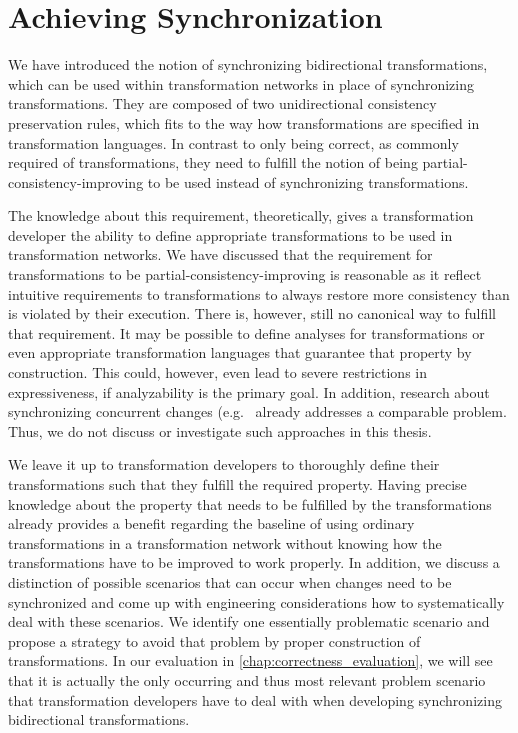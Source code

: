 \section{Achieving Synchronization} %
\label{chap:synchronization:achieving}

We have introduced the notion of synchronizing bidirectional transformations, which can be used within transformation networks in place of synchronizing transformations.
They are composed of two unidirectional consistency preservation rules, which fits to the way how transformations are specified in transformation languages.
In contrast to only being correct, as commonly required of transformations, they need to fulfill the notion of being partial-consistency-improving to be used instead of synchronizing transformations.

The knowledge about this requirement, theoretically, gives a transformation developer the ability to define appropriate transformations to be used in transformation networks.
We have discussed that the requirement for transformations to be partial-consistency-improving is reasonable as it reflect intuitive requirements to transformations to always restore more consistency than is violated by their execution.
There is, however, still no canonical way to fulfill that requirement.
It may be possible to define analyses for transformations or even appropriate transformation languages that guarantee that property by construction.
This could, however, even lead to severe restrictions in expressiveness, if analyzability is the primary goal.
In addition, research about synchronizing concurrent changes (e.g.~\cite{hermann2012concurrentSynchronization-FASE,orejas2020IncrementalConcurrentSynchronization-FASE,xiong2013SynchronizingConcurrentUpdates-SoSym,xiong2009parallelUpdates-ICMT} already addresses a comparable problem.
Thus, we do not discuss or investigate such approaches in this thesis.

We leave it up to transformation developers to thoroughly define their transformations such that they fulfill the required property.
Having precise knowledge about the property that needs to be fulfilled by the transformations already provides a benefit regarding the baseline of using ordinary transformations in a transformation network without knowing how the transformations have to be improved to work properly.
In addition, we discuss a distinction of possible scenarios that can occur when changes need to be synchronized and come up with engineering considerations how to systematically deal with these scenarios.
We identify one essentially problematic scenario and propose a strategy to avoid that problem by proper construction of transformations.
In our evaluation in \autoref{chap:correctness_evaluation}, we will see that it is actually the only occurring and thus most relevant problem scenario that transformation developers have to deal with when developing synchronizing bidirectional transformations.

